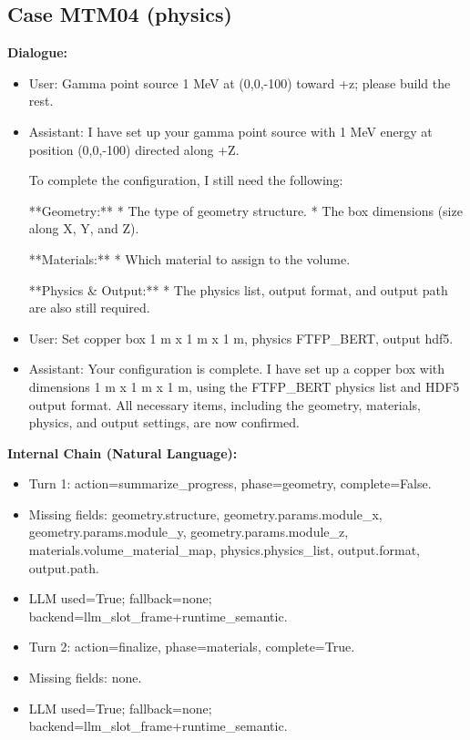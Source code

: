 \documentclass[11pt]{ctexart}
\begin{document}
\subsection{Case MTM04 (physics)}
\textbf{Dialogue:}
\begin{itemize}
\item User: Gamma point source 1 MeV at (0,0,-100) toward +z; please build the rest.
\item Assistant: I have set up your gamma point source with 1 MeV energy at position (0,0,-100) directed along +Z.

To complete the configuration, I still need the following:

**Geometry:**
*   The type of geometry structure.
*   The box dimensions (size along X, Y, and Z).

**Materials:**
*   Which material to assign to the volume.

**Physics \& Output:**
*   The physics list, output format, and output path are also still required.
\item User: Set copper box 1 m x 1 m x 1 m, physics FTFP\_BERT, output hdf5.
\item Assistant: Your configuration is complete. I have set up a copper box with dimensions 1 m x 1 m x 1 m, using the FTFP\_BERT physics list and HDF5 output format. All necessary items, including the geometry, materials, physics, and output settings, are now confirmed.
\end{itemize}
\textbf{Internal Chain (Natural Language):}
\begin{itemize}
\item Turn 1: action=summarize\_progress, phase=geometry, complete=False.
\item Missing fields: geometry.structure, geometry.params.module\_x, geometry.params.module\_y, geometry.params.module\_z, materials.volume\_material\_map, physics.physics\_list, output.format, output.path.
\item LLM used=True; fallback=none; backend=llm\_slot\_frame+runtime\_semantic.
\item Turn 2: action=finalize, phase=materials, complete=True.
\item Missing fields: none.
\item LLM used=True; fallback=none; backend=llm\_slot\_frame+runtime\_semantic.
\end{itemize}
\end{document}
